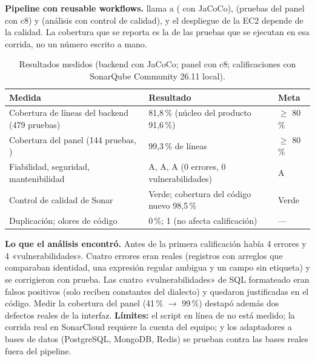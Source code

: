 \textbf{Pipeline con reusable workflows.}  llama a  ( con JaCoCo),
 (pruebas del panel con c8) y  (análisis con control de calidad), y el despliegue de la
EC2 depende de la calidad. La cobertura que se reporta es la de las pruebas que se ejecutan en esa corrida, no un número escrito a mano.

\begin{table}[H]
\centering\small
\caption{Resultados medidos (backend con JaCoCo; panel con c8; calificaciones con SonarQube Community 26.11 local).}\label{tab:mt-resultados}
\begin{tabularx}{\textwidth}{lYY}
\toprule
\textbf{Medida} & \textbf{Resultado} & \textbf{Meta} \\
\midrule
Cobertura de líneas del backend (479 pruebas) & 81,8\,\% (núcleo del producto 91,6\,\%) & $\geq$ 80\,\% \\
Cobertura del panel (144 pruebas, ) & 99,3\,\% de líneas & $\geq$ 80\,\% \\
Fiabilidad, seguridad, mantenibilidad & A, A, A (0 errores, 0 vulnerabilidades) & A \\
Control de calidad de Sonar & Verde; cobertura del código nuevo 98,5\,\% & Verde \\
Duplicación; olores de código & 0\,\%; 1 (no afecta calificación) & --- \\
\bottomrule
\end{tabularx}
\end{table}

\textbf{Lo que el análisis encontró.} Antes de la primera calificación había 4 errores y 4 «vulnerabilidades». Cuatro errores eran reales
(registros con arreglos que comparaban identidad, una expresión regular ambigua y un campo sin etiqueta) y se corrigieron con prueba. Las
cuatro «vulnerabilidades» de SQL formateado eran falsos positivos (solo reciben constantes del dialecto) y quedaron justificadas en el código.
Medir la cobertura del panel (41\,\% $\rightarrow$ 99\,\%) destapó además dos defectos reales de la interfaz. \textbf{Límites:} el script en
línea de  no está medido; la corrida real en SonarCloud requiere la cuenta del equipo; y los adaptadores a bases de datos
(PostgreSQL, MongoDB, Redis) se prueban contra las bases reales fuera del pipeline.

